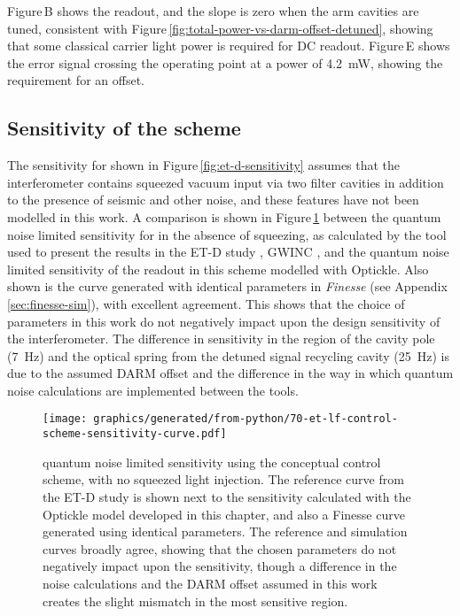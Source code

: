 Figure\,B shows the \ASDC{} readout, and the slope is zero when the arm cavities are tuned, consistent with Figure\,\ref{fig:total-power-vs-darm-offset-detuned}, showing that some classical carrier light power is required for \gls{DC} readout. Figure\,E shows the error signal crossing the operating point at a power of \SI{4.2}{\milli\watt}, showing the requirement for an offset.

\subsection{Sensitivity of the scheme}
The sensitivity for \ETLF{} shown in Figure\,\ref{fig:et-d-sensitivity} assumes that the interferometer contains squeezed vacuum input via two filter cavities in addition to the presence of seismic and other noise, and these features have not been modelled in this work. A comparison is shown in Figure\,\ref{fig:et-lf-control-scheme-sensitivity} between the quantum noise limited sensitivity for \ETLF{} in the absence of squeezing, as calculated by the tool used to present the results in the ET-D study \cite{Hild2011}, \gls{GWINC} \cite{gwinc}, and the quantum noise limited sensitivity of the \ASDC{} readout in this scheme modelled with Optickle. Also shown is the curve generated with identical parameters in \emph{Finesse} (see Appendix\,\ref{sec:finesse-sim}), with excellent agreement. This shows that the choice of parameters in this work do not negatively impact upon the design sensitivity of the interferometer. The difference in sensitivity in the region of the cavity pole (\SI{7}{\hertz}) and the optical spring from the detuned signal recycling cavity (\SI{25}{\hertz}) is due to the assumed \gls{DARM} offset and the difference in the way in which quantum noise calculations are implemented between the tools.

\begin{figure}
  \centering
  \texttt{[image: graphics/generated/from-python/70-et-lf-control-scheme-sensitivity-curve.pdf]}
  \caption[ET-LF quantum noise limited sensitivity using the conceptual control scheme]{\label{fig:et-lf-control-scheme-sensitivity}\ETLF{} quantum noise limited sensitivity using the conceptual control scheme, with no squeezed light injection. The reference curve from the ET-D study is shown next to the sensitivity calculated with the Optickle model developed in this chapter, and also a Finesse curve generated using identical parameters. The reference and simulation curves broadly agree, showing that the chosen parameters do not negatively impact upon the sensitivity, though a difference in the noise calculations and the \gls{DARM} offset assumed in this work creates the slight mismatch in the most sensitive region.}
\end{figure}

